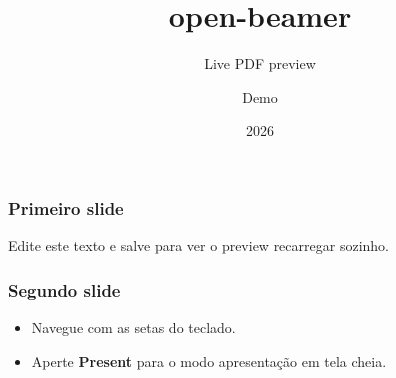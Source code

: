 \documentclass[aspectratio=169]{beamer}
\title{open-beamer}
\subtitle{Live PDF preview}
\author{Demo}
\date{2026}
\begin{document}
\begin{frame}
  \titlepage
\end{frame}

\begin{frame}
  \frametitle{Primeiro slide}
  Edite este texto e salve para ver o preview recarregar sozinho.
\end{frame}

\begin{frame}
  \frametitle{Segundo slide}
  \begin{itemize}
    \item Navegue com as setas do teclado.
    \item Aperte \textbf{Present} para o modo apresenta\c{c}\~ao em tela cheia.
  \end{itemize}
\end{frame}
\end{document}
